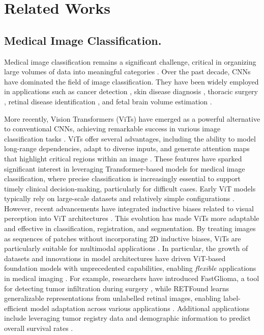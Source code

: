 \documentclass[times,twocolumn,final]{elsarticle}
\begin{document}
%
%


\section{Related Works}
\label{sec:2}

\subsection{Medical Image Classification.}
Medical image classification remains a significant challenge, critical in organizing large volumes of data into meaningful categories \cite{azad2024advances}. Over the past decade, CNNs have dominated the field of image classification. They have been widely employed in applications such as cancer detection \cite{ren2023ipsilateral}, skin disease diagnosis \cite{elbatel2023fopro}, thoracic surgery \cite{harirpoush2024architecture}, retinal disease identification \cite{ju2023hierarchical}, and fetal brain volume estimation \cite{pei2023pets}.

More recently, Vision Transformers (ViTs) have emerged as a powerful alternative to conventional CNNs, achieving remarkable success in various image classification tasks \cite{swin, mobilevit_v2, Twins, CSWin}. ViTs offer several advantages, including the ability to model long-range dependencies, adapt to diverse inputs, and generate attention maps that highlight critical regions within an image \cite{gheflati2022vision}. These features have sparked significant interest in leveraging Transformer-based models for medical image classification, where precise classification is increasingly essential to support timely clinical decision-making, particularly for difficult cases.
Early ViT models typically rely on large-scale datasets and relatively simple configurations \cite{ViT}. However, recent advancements have integrated inductive biases related to visual perception into ViT architectures \cite{manzari2023robust, yu2022metaformer, wang2024repvit, yan2023hybrid}. This evolution has made ViTs more adaptable and effective in classification, registration, and segmentation. By treating images as sequences of patches without incorporating 2D inductive biases, ViTs are particularly suitable for multimodal applications \cite{xu2023research}.
In particular, the growth of datasets and innovations in model architectures have driven ViT-based foundation models with unprecedented capabilities, enabling \textit{flexible} applications in medical imaging \cite{manigrasso2025mammography, horst2024cellvit, koleilat2024medclip}. For example, researchers have introduced FastGlioma, a tool for detecting tumor infiltration during surgery \cite{kondepudi2024foundation}, while RETFound learns generalizable representations from unlabelled retinal images, enabling label-efficient model adaptation across various applications \cite{zhou2023foundation}. Additional applications include leveraging tumor registry data and demographic information to predict overall survival rates \cite{jee2024automated}. %
\end{document}
